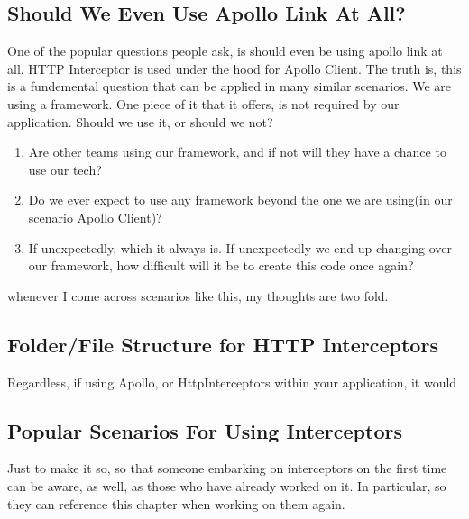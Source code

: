 \subsection{Should We Even Use Apollo Link At All?}
One of the popular questions people ask, is should even be using apollo link at 
all. HTTP Interceptor is used under the hood for Apollo Client. The truth is, 
this is a fundemental question that can be applied in many similar scenarios. 
We are using a framework. One piece of it that it offers, is not required by 
our application. Should we use it, or should we not? 
\begin{enumerate}
  \item Are other teams using our framework, and if not will they have a chance
  to use our tech? 
  \item Do we ever expect to use any framework beyond the one we are using(in our 
  scenario Apollo Client)? 
  \item If unexpectedly, which it always is. If unexpectedly we end up changing
  over our framework, how difficult will it be to create this code once again? 
\end{enumerate}
whenever I come across scenarios like this, my thoughts are two fold. 

\subsection{Folder/File Structure for HTTP Interceptors}
Regardless, if using Apollo, or HttpInterceptors within your application, it 
would

\subsection{Popular Scenarios For Using Interceptors}
Just to make it so, so that someone embarking on interceptors on the first 
time can be aware, as well, as those who have already worked on it. In
particular, so they can reference this chapter when working on them again. 

